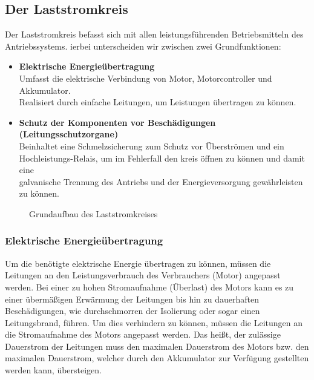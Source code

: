 \subsection{Der Laststromkreis}
Der Laststromkreis befasst sich mit allen leistungsführenden Betriebsmitteln des Antriebssystems. ierbei unterscheiden wir zwischen zwei Grundfunktionen:
\\[5mm]
\begin{itemize}
	\item \textbf{Elektrische Energieübertragung}
	\\ \medskip Umfasst die elektrische Verbindung von Motor, Motorcontroller und Akkumulator. 			\\ Realisiert durch einfache Leitungen, um Leistungen übertragen zu können.
	\medskip
	\item \textbf{Schutz der Komponenten vor Beschädigungen (Leitungsschutzorgane)}
	\\ \medskip Beinhaltet eine Schmelzsicherung zum Schutz vor Überströmen und ein 					\\ Hochleistungs-Relais, um im Fehlerfall den kreis öffnen zu können und damit eine  		
	\\ galvanische Trennung des Antriebs und der Energieversorgung gewährleisten zu können.
\end{itemize}

\begin{figure}[H]
	\begin{center}
		\caption{Grundaufbau des Laststromkreises}
	\end{center}
\end{figure}

\newpage



\subsubsection{Elektrische Energieübertragung}
Um die benötigte elektrische Energie übertragen zu können, müssen die Leitungen an den Leistungsverbrauch des Verbrauchers (Motor) angepasst werden. Bei einer zu hohen Stromaufnahme (Überlast) des Motors kann es zu einer übermäßigen Erwärmung der Leitungen bis hin zu dauerhaften Beschädigungen, wie durchschmorren der Isolierung oder sogar einen Leitungsbrand, führen. Um dies verhindern zu können, müssen die Leitungen an die Stromaufnahme des Motors angepasst werden. Das heißt, der zulässige Dauerstrom der Leitungen muss den maximalen Dauerstrom des Motors bzw. den maximalen Dauerstrom, welcher durch den Akkumulator zur Verfügung gestellten werden kann, übersteigen.
\\[5mm]

